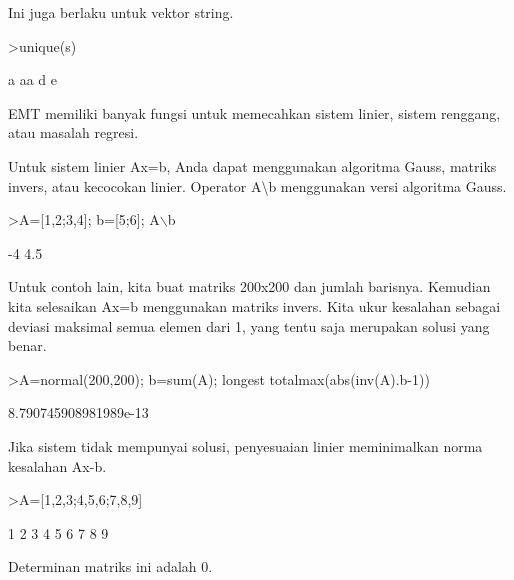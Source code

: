 \documentclass[a4paper,10pt]{article}
\begin{document}
\begin{eulernotebook}
\begin{eulercomment}
\begin{eulercomment}
\begin{eulercomment}
\begin{eulercomment}
\begin{eulercomment}
\begin{eulercomment}
\begin{eulercomment}
Ini juga berlaku untuk vektor string.
\end{eulercomment}
\begin{eulerprompt}
>unique(s)
\end{eulerprompt}
\begin{euleroutput}
  a
  aa
  d
  e
\end{euleroutput}
\begin{eulercomment}
EMT memiliki banyak fungsi untuk memecahkan sistem linier, sistem
renggang, atau masalah regresi.

Untuk sistem linier Ax=b, Anda dapat menggunakan algoritma Gauss,
matriks invers, atau kecocokan linier. Operator A\textbackslash{}b menggunakan versi
algoritma Gauss.
\end{eulercomment}
\begin{eulerprompt}
>A=[1,2;3,4]; b=[5;6]; A\(\backslash\)b
\end{eulerprompt}
\begin{euleroutput}
             -4 
            4.5 
\end{euleroutput}
\begin{eulercomment}
Untuk contoh lain, kita buat matriks 200x200 dan jumlah barisnya.
Kemudian kita selesaikan Ax=b menggunakan matriks invers. Kita ukur
kesalahan sebagai deviasi maksimal semua elemen dari 1, yang tentu
saja merupakan solusi yang benar.
\end{eulercomment}
\begin{eulerprompt}
>A=normal(200,200); b=sum(A); longest totalmax(abs(inv(A).b-1))
\end{eulerprompt}
\begin{euleroutput}
    8.790745908981989e-13 
\end{euleroutput}
\begin{eulercomment}
Jika sistem tidak mempunyai solusi, penyesuaian linier meminimalkan
norma kesalahan Ax-b.
\end{eulercomment}
\begin{eulerprompt}
>A=[1,2,3;4,5,6;7,8,9]
\end{eulerprompt}
\begin{euleroutput}
              1             2             3 
              4             5             6 
              7             8             9 
\end{euleroutput}
\begin{eulercomment}
Determinan matriks ini adalah 0.
\end{eulercomment}
\begin{eulerprompt}

\end{eulerprompt}
\end{eulercomment}
\end{eulercomment}
\end{eulercomment}
\end{eulercomment}
\end{eulercomment}
\end{eulercomment}
\end{eulernotebook}
\end{document}
